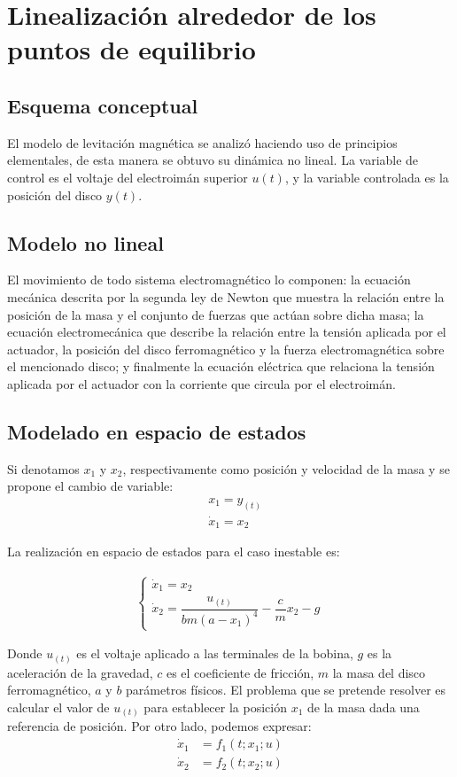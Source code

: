 \section{Linealización alrededor de los puntos de equilibrio}

\subsection*{Esquema conceptual}
El modelo de levitación magnética se analizó haciendo uso de principios elementales, de esta manera se obtuvo su dinámica no lineal. La variable de control es el voltaje del electroimán superior $u(t)$, y la variable controlada es la posición del disco $y(t)$.
\subsection*{Modelo no lineal}
El movimiento de todo sistema electromagnético lo componen: la ecuación mecánica descrita por la segunda ley de Newton que muestra la relación entre la posición de la masa y el conjunto de fuerzas que actúan sobre dicha masa; la ecuación electromecánica que describe la relación entre la tensión aplicada por el actuador, la posición del disco ferromagnético y la fuerza electromagnética sobre el mencionado disco; y finalmente la ecuación eléctrica que relaciona la tensión aplicada por el actuador con la corriente que circula por el electroimán.

\subsection*{Modelado en espacio de estados}
Si denotamos ${x}_{1}$ y ${x}_{2}$, respectivamente como posición y velocidad de la masa y se propone el cambio de variable:
\begin{align*} 
&x_{1}=  y_{(t)} \\ 
&\dot{x}_{1}=x_{2}
\end{align*}

La realización en espacio de estados para el caso inestable es:

\begin{align*}
    \begin{cases}
        \dot{x}_1 = x_2 \\
        \dot{x}_2 = \dfrac{u_{(t)}}{bm(a - x_1)^4} - \dfrac{c}{m}x_2 - g
    \end{cases}
\end{align*}

Donde  $u_{(t)}$ es el voltaje aplicado a las terminales de la bobina, $g$ es la aceleración de la gravedad, $c$ es el coeficiente de fricción, $m$ la masa del disco ferromagnético, $a$ y $b$ parámetros físicos. El problema que se pretende resolver es calcular el valor de $u_{(t)}$ para establecer la posición $x_{1}$ de la masa dada una referencia de posición.
Por otro lado, podemos expresar:
\begin{align*}
    \dot{x}_{1} &= f_{1}(t;x_{1};u) \\
    \dot{x}_{2} &= f_{2}(t;x_{2}; u)
\end{align*}

